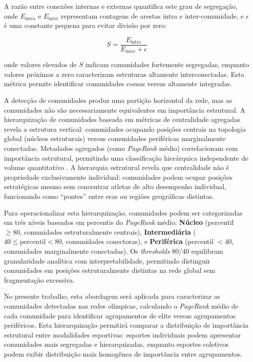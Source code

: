 A razão entre conexões internas e externas quantifica este grau de segregação, onde $E_{\mathrm{intra}}$ e $E_{\mathrm{inter}}$ representam contagens de arestas intra e inter-comunidade, e $\epsilon$ é uma constante pequena para evitar divisão por zero:

\begin{equation}
    S = \frac{E_{\mathrm{intra}}}{E_{\mathrm{inter}} + \epsilon}
\end{equation}

\noindent onde valores elevados de $S$ indicam comunidades fortemente segregadas, enquanto valores próximos a zero caracterizam estruturas altamente interconectadas. Esta métrica permite identificar comunidades coesas versus altamente integradas.

A detecção de comunidades produz uma partição horizontal da rede, mas as comunidades não são necessariamente equivalentes em importância estrutural. A hierarquização de comunidades baseada em métricas de centralidade agregadas revela a estrutura vertical: comunidades ocupando posições centrais na topologia global (núcleos estruturais) versus comunidades periféricas marginalmente conectadas. Metadados agregados (como \textit{PageRank} médio) correlacionam com importância estrutural, permitindo uma classificação hierárquica independente de volume quantitativo \cite{Eriksson2022NetworkMetadata}. A hierarquia estrutural revela que centralidade não é propriedade exclusivamente individual: comunidades podem ocupar posições estratégicas mesmo sem concentrar atletas de alto desempenho individual, funcionando como ``pontes'' entre eras ou regiões geográficas distintas.

Para operacionalizar esta hierarquização, comunidades podem ser categorizadas em três níveis baseados em percentis do \textit{PageRank}{} médio: \textbf{Núcleo} (percentil $\geq 80$, comunidades estruturalmente centrais), \textbf{Intermediária} ($40 \leq \mathrm{percentil} < 80$, comunidades conectoras), e \textbf{Periférica} (percentil $< 40$, comunidades marginalmente conectadas). Os \textit{thresholds} 80/40 equilibram granularidade analítica com interpretabilidade, permitindo distinguir comunidades em posições estruturalmente distintas na rede global sem fragmentação excessiva.

No presente trabalho, esta abordagem será aplicada para caracterizar as comunidades detectadas nas redes olímpicas, calculando o \textit{PageRank}{} médio de cada comunidade para identificar agrupamentos de elite versus agrupamentos periféricos. Esta hierarquização permitirá comparar a distribuição de importância estrutural entre modalidades esportivas: esportes individuais podem apresentar comunidades mais segregadas e hierarquizadas, enquanto esportes coletivos podem exibir distribuição mais homogênea de importância entre agrupamentos.

